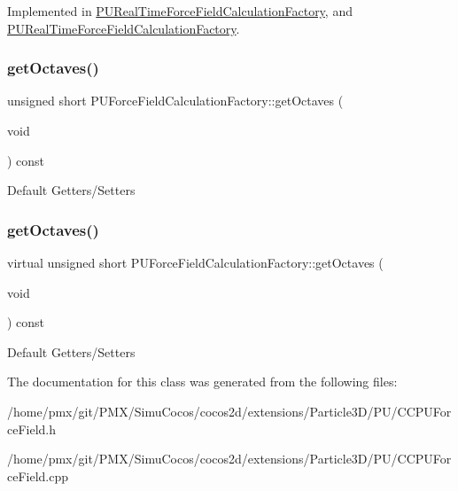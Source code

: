Implemented in \hyperlink{classPURealTimeForceFieldCalculationFactory_a009d7bb7e28b4995a1600b3b1ac3895e}{P\+U\+Real\+Time\+Force\+Field\+Calculation\+Factory}, and \hyperlink{classPURealTimeForceFieldCalculationFactory_ac698047a4841663680ed761857e9ae20}{P\+U\+Real\+Time\+Force\+Field\+Calculation\+Factory}.

\mbox{\label{classPUForceFieldCalculationFactory_a1c537b71a537b6e7450dac5ac5b9189b}} 
\subsubsection{\texorpdfstring{get\+Octaves()}{getOctaves()}\hspace{0.1cm}{\footnotesize\ttfamily [1/2]}}
{\footnotesize\ttfamily unsigned short P\+U\+Force\+Field\+Calculation\+Factory\+::get\+Octaves (\begin{DoxyParamCaption}\item[{void}]{ }\end{DoxyParamCaption}) const\hspace{0.3cm}{\ttfamily [virtual]}}

Default Getters/\+Setters \mbox{\label{classPUForceFieldCalculationFactory_a6e6dd4ec99abdedab4178d91406fb374}} 
\subsubsection{\texorpdfstring{get\+Octaves()}{getOctaves()}\hspace{0.1cm}{\footnotesize\ttfamily [2/2]}}
{\footnotesize\ttfamily virtual unsigned short P\+U\+Force\+Field\+Calculation\+Factory\+::get\+Octaves (\begin{DoxyParamCaption}\item[{void}]{ }\end{DoxyParamCaption}) const\hspace{0.3cm}{\ttfamily [virtual]}}

Default Getters/\+Setters 

The documentation for this class was generated from the following files\+:\begin{DoxyCompactItemize}
\item 
/home/pmx/git/\+P\+M\+X/\+Simu\+Cocos/cocos2d/extensions/\+Particle3\+D/\+P\+U/C\+C\+P\+U\+Force\+Field.\+h\item 
/home/pmx/git/\+P\+M\+X/\+Simu\+Cocos/cocos2d/extensions/\+Particle3\+D/\+P\+U/C\+C\+P\+U\+Force\+Field.\+cpp\end{DoxyCompactItemize}

